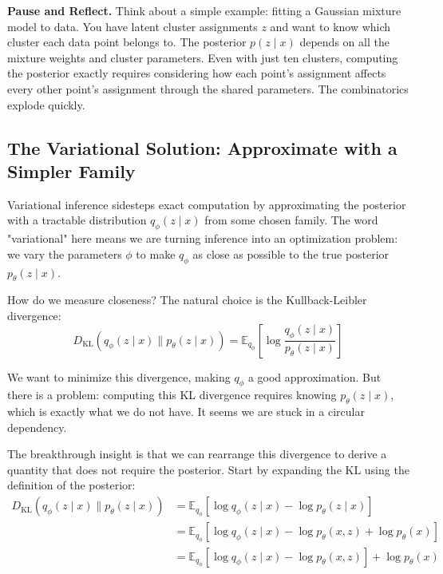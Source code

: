 \vspace{1.5em}

\begin{pausebox}
\textbf{Pause and Reflect.} Think about a simple example: fitting a Gaussian mixture model to data. You have latent cluster assignments $z$ and want to know which cluster each data point belongs to. The posterior $p(z \mid x)$ depends on all the mixture weights and cluster parameters. Even with just ten clusters, computing the posterior exactly requires considering how each point's assignment affects every other point's assignment through the shared parameters. The combinatorics explode quickly.
\end{pausebox}

\vspace{1.5em}

\subsection{The Variational Solution: Approximate with a Simpler Family}

Variational inference sidesteps exact computation by approximating the posterior with a tractable distribution $q_\phi(z \mid x)$ from some chosen family. The word "variational" here means we are turning inference into an optimization problem: we vary the parameters $\phi$ to make $q_\phi$ as close as possible to the true posterior $p_\theta(z \mid x)$.

\vspace{0.3cm}

How do we measure closeness? The natural choice is the Kullback-Leibler divergence:
%
\begin{equation}
D_{\text{KL}}(q_\phi(z \mid x) \| p_\theta(z \mid x))
= \mathbb{E}_{q_\phi} \left[ \log \frac{q_\phi(z \mid x)}{p_\theta(z \mid x)} \right]
\end{equation}

\vspace{0.3cm}

We want to minimize this divergence, making $q_\phi$ a good approximation. But there is a problem: computing this KL divergence requires knowing $p_\theta(z \mid x)$, which is exactly what we do not have. It seems we are stuck in a circular dependency.

\vspace{0.3cm}

The breakthrough insight is that we can rearrange this divergence to derive a quantity that does not require the posterior. Start by expanding the KL using the definition of the posterior:
%
\begin{align}
D_{\text{KL}}(q_\phi(z \mid x) \| p_\theta(z \mid x))
&= \mathbb{E}_{q_\phi} \left[ \log q_\phi(z \mid x) - \log p_\theta(z \mid x) \right] \\
&= \mathbb{E}_{q_\phi} \left[ \log q_\phi(z \mid x) - \log p_\theta(x, z) + \log p_\theta(x) \right] \\
&= \mathbb{E}_{q_\phi} \left[ \log q_\phi(z \mid x) - \log p_\theta(x, z) \right] + \log p_\theta(x)
\end{align}

